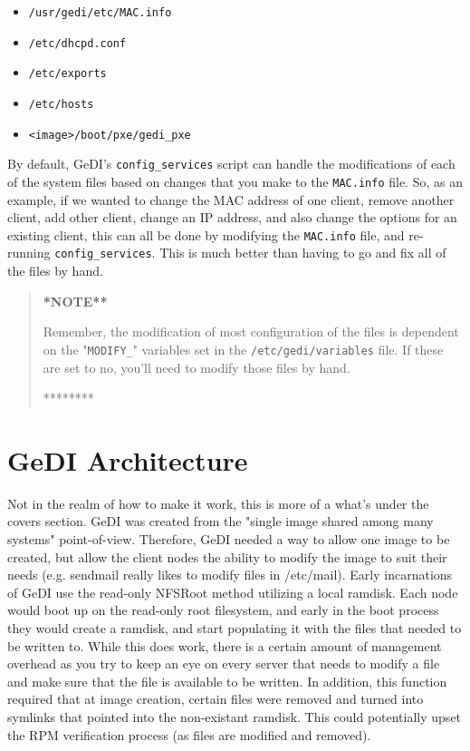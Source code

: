 \documentclass[10pt,a4paper,titlepage]{article}
\begin{document}
\begin{itemize}
\parskip=0pt
\item \verb!/usr/gedi/etc/MAC.info!
\item \verb!/etc/dhcpd.conf!
\item \verb!/etc/exports!
\item \verb!/etc/hosts!
\item \verb!<image>/boot/pxe/gedi_pxe!
\end{itemize}

By default, GeDI's \verb!config_services! script can handle the modifications
of each of the system files based on changes that you make to the
\verb!MAC.info! file.  So, as an example, if we wanted to change the MAC address
of one client, remove another client, add other client, change an IP address,
and also change the options for an existing client, this can all be done by
modifying the \verb!MAC.info! file, and re-running \verb!config_services!.  This
is much better than having to go and fix all of the files by hand.

\begin{quote}
\bf**NOTE**\par
Remember, the modification of most configuration of the files is dependent on
the "\verb!MODIFY_!" variables set in the \verb!/etc/gedi/variables! file.
If these are set to no, you'll need to modify those files by hand.\par
********
\end{quote}

\section{GeDI Architecture}
Not in the realm of how to make it work, this is more of a what's under the
covers section.  GeDI was created from the "single image shared among many
systems" point-of-view.  Therefore, GeDI needed a way to allow one image to be
created, but allow the client nodes the ability to modify the image to suit
their needs (e.g. sendmail really likes to modify files in /etc/mail).  Early
incarnations of GeDI use the read-only NFSRoot method utilizing a local ramdisk.
Each node would boot up on the read-only root filesystem, and early in the boot
process they would create a ramdisk, and start populating it with the files that
needed to be written to.  While this does work, there is a certain amount of
management overhead as you try to keep an eye on every server that needs to
modify a file and make sure that the file is available to be written.  In
addition, this function required that at image creation, certain files were
removed and turned into symlinks that pointed into the non-existant ramdisk.
This could potentially upset the RPM verification process (as files are modified
and removed).
\end{document}
